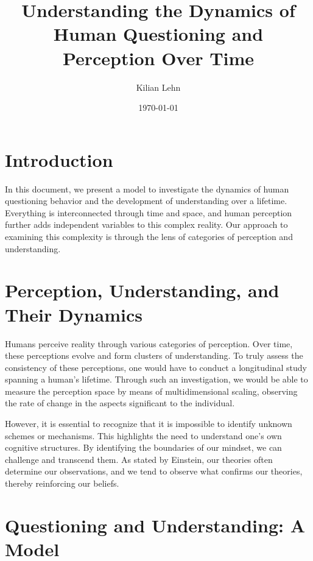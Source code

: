 \documentclass{article}
\begin{document}
\title{Understanding the Dynamics of Human Questioning and Perception Over Time}
\author{Kilian Lehn}
\date{\today}
\maketitle

\section{Introduction}

In this document, we present a model to investigate the dynamics of human questioning behavior and the development of understanding over a lifetime. Everything is interconnected through time and space, and human perception further adds independent variables to this complex reality. Our approach to examining this complexity is through the lens of categories of perception and understanding.

\section{Perception, Understanding, and Their Dynamics}

Humans perceive reality through various categories of perception. Over time, these perceptions evolve and form clusters of understanding. To truly assess the consistency of these perceptions, one would have to conduct a longitudinal study spanning a human's lifetime. Through such an investigation, we would be able to measure the perception space by means of multidimensional scaling, observing the rate of change in the aspects significant to the individual.

However, it is essential to recognize that it is impossible to identify unknown schemes or mechanisms. This highlights the need to understand one's own cognitive structures. By identifying the boundaries of our mindset, we can challenge and transcend them. As stated by Einstein, our theories often determine our observations, and we tend to observe what confirms our theories, thereby reinforcing our beliefs.

\clearpage
\section{Questioning and Understanding: A Model}
\end{document}

